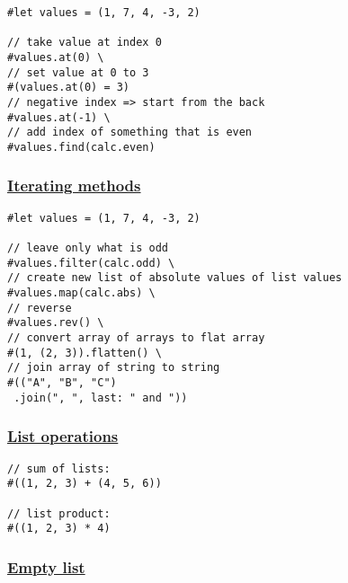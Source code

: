 \begin{verbatim}
#let values = (1, 7, 4, -3, 2)

// take value at index 0
#values.at(0) \
// set value at 0 to 3
#(values.at(0) = 3)
// negative index => start from the back
#values.at(-1) \
// add index of something that is even
#values.find(calc.even)
\end{verbatim}

\pandocbounded{}

\subsubsection{\texorpdfstring{\hyperref[iterating-methods]{Iterating
methods}}{Iterating methods}}\label{iterating-methods}

\begin{verbatim}
#let values = (1, 7, 4, -3, 2)

// leave only what is odd
#values.filter(calc.odd) \
// create new list of absolute values of list values
#values.map(calc.abs) \
// reverse
#values.rev() \
// convert array of arrays to flat array
#(1, (2, 3)).flatten() \
// join array of string to string
#(("A", "B", "C")
 .join(", ", last: " and "))
\end{verbatim}

\pandocbounded{}

\subsubsection{\texorpdfstring{\hyperref[list-operations]{List
operations}}{List operations}}\label{list-operations}

\begin{verbatim}
// sum of lists:
#((1, 2, 3) + (4, 5, 6))

// list product:
#((1, 2, 3) * 4)
\end{verbatim}

\pandocbounded{}

\subsubsection{\texorpdfstring{\hyperref[empty-list]{Empty
list}}{Empty list}}\label{empty-list}

